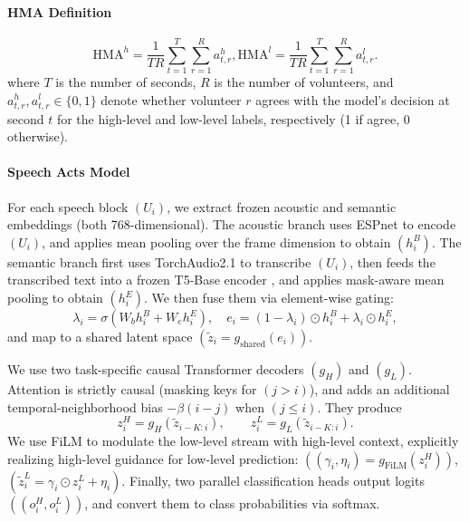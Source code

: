 \paragraph{HMA Definition}
\[
\mathrm{HMA}^{h}
=\frac{1}{TR}\sum_{t=1}^{T}\sum_{r=1}^{R} a^{h}_{t,r},
\mathrm{HMA}^{l}
=\frac{1}{TR}\sum_{t=1}^{T}\sum_{r=1}^{R} a^{l}_{t,r}.
\]
where $T$ is the number of seconds, $R$ is the number of volunteers, and $a^{h}_{t,r}, a^{l}_{t,r}\in\{0,1\}$ denote whether volunteer $r$ agrees with the model’s decision at second $t$ for the high-level and low-level labels, respectively (1 if agree, 0 otherwise).

\paragraph{Speech Acts Model}
For each speech block $(U_i)$, we extract frozen acoustic and semantic embeddings (both 768-dimensional). The acoustic branch uses ESPnet \citep{watanabe2018espnetendtoendspeechprocessing} to encode $(U_i)$, and applies mean pooling over the frame dimension to obtain $(h_i^{B})$. The semantic branch first uses TorchAudio2.1 \citep{hwang2023torchaudio21advancingspeech} to transcribe $(U_i)$, then feeds the transcribed text into a frozen T5-Base encoder \citep{raffel2020exploring}, and applies mask-aware mean pooling to obtain $(h_i^{E})$. We then fuse them via element-wise gating:
\[
\lambda_i=\sigma(W_b h_i^{B}+W_e h_i^{E}),\quad
e_i=(1-\lambda_i)\odot h_i^{B}+\lambda_i\odot h_i^{E},
\]
and map to a shared latent space $(\tilde z_i=g_{\text{shared}}(e_i))$.

We use two task-specific causal Transformer decoders $(g_H)$ and $(g_L)$. Attention is strictly causal (masking keys for $(j>i)$), and adds an additional temporal-neighborhood bias $-\beta(i-j)$ when $(j\le i)$. They produce
\[
z_i^H=g_H(\tilde z_{i-K:i}),\qquad z_i^L=g_L(\tilde z_{i-K:i}).
\]
We use FiLM \citep{perez2018film} to modulate the low-level stream with high-level context, explicitly realizing high-level guidance for low-level prediction: $((\gamma_i,\eta_i)=g_{\text{FiLM}}(z_i^H))$, $(\tilde z_i^L=\gamma_i\odot z_i^L+\eta_i)$. Finally, two parallel classification heads output logits $((o_i^H,o_i^L))$, and convert them to class probabilities via softmax.

